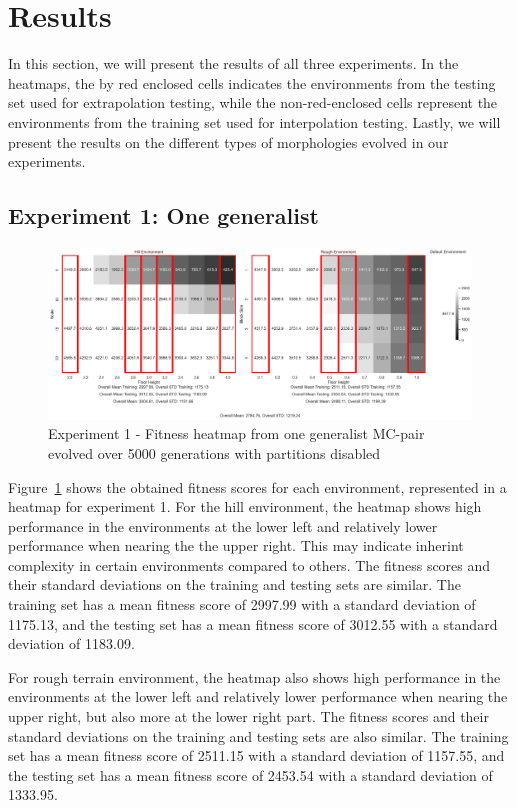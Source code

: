 \section{Results}
    In this section, we will present the results of all three experiments. In the heatmaps, the by red enclosed cells indicates the environments from the testing set used for extrapolation testing, while the non-red-enclosed cells represent the environments from the training set used for interpolation testing. Lastly, we will present the results on the different types of morphologies evolved in our experiments.
    \subsection{Experiment 1: One generalist}
        \begin{figure}[ht]
            \centering
            \includegraphics[width=\linewidth]{./resources/generalist_4_2784/fitness_heatmap.png}
            \caption{Experiment 1 - Fitness heatmap from one generalist MC-pair evolved over 5000 generations with partitions disabled}
            \label{fig:fit_heat_generalist}
        \end{figure}

        Figure~\ref{fig:fit_heat_generalist} shows the obtained fitness scores for each environment, represented in a heatmap for experiment 1. For the hill environment, the heatmap shows high performance in the environments at the lower left and relatively lower performance when nearing the the upper right. This may indicate inherint complexity in certain environments compared to others. The fitness scores and their standard deviations on the training and testing sets are similar. The training set has a mean fitness score of 2997.99 with a standard deviation of 1175.13, and the testing set has a mean fitness score of 3012.55 with a standard deviation of 1183.09. 
        
        For rough terrain environment, the heatmap also shows high performance in the environments at the lower left and relatively lower performance when nearing the upper right, but also more at the lower right part. The fitness scores and their standard deviations on the training and testing sets are also similar. The training set has a mean fitness score of 2511.15 with a standard deviation of 1157.55, and the testing set has a mean fitness score of 2453.54 with a standard deviation of 1333.95.
    
